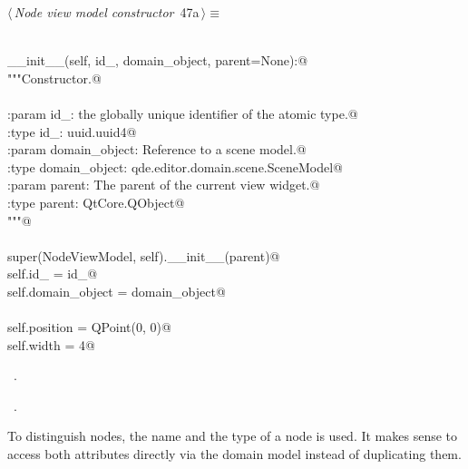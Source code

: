 \documentclass[
    a4paper,      %
    10pt,         %
    openright,    %
    notitlepage,  %
    parskip=half, %
]{scrreprt}       %
\theoremstyle{definition}                    %
\begin{document}
\begin{flushleft} \small
\begin{minipage}{\linewidth}\label{scrap60}\raggedright\small
{} $\langle\,${\itshape Node view model constructor}\nobreak\ {\footnotesize {47a}}$\,\rangle\equiv$
\vspace{-1exm}
\begin{list}{}{} \item
\mbox{}\lstinline@@\\
\mbox{}\lstinline@def __init__(self, id_, domain_object, parent=None):@\\
\mbox{}\lstinline@    """Constructor.@\\
\mbox{}\lstinline@@\\
\mbox{}\lstinline@    :param id_: the globally unique identifier of the atomic type.@\\
\mbox{}\lstinline@    :type  id_: uuid.uuid4@\\
\mbox{}\lstinline@    :param domain_object: Reference to a scene model.@\\
\mbox{}\lstinline@    :type  domain_object: qde.editor.domain.scene.SceneModel@\\
\mbox{}\lstinline@    :param parent: The parent of the current view widget.@\\
\mbox{}\lstinline@    :type parent:  QtCore.QObject@\\
\mbox{}\lstinline@    """@\\
\mbox{}\lstinline@@\\
\mbox{}\lstinline@    super(NodeViewModel, self).__init__(parent)@\\
\mbox{}\lstinline@    self.id_ = id_@\\
\mbox{}\lstinline@    self.domain_object = domain_object@\\
\mbox{}\lstinline@@\\
\mbox{}\lstinline@    self.position = QPoint(0, 0)@\\
\mbox{}\lstinline@    self.width = 4@\\
\mbox{}\lstinline@@{\NWsep}
\end{list}
\vspace{-1.5ex}
\footnotesize
\begin{list}{}{\setlength{\itemsep}{-\parsep}\setlength{\itemindent}{-\leftmargin}}
\item \NWtxtMacroDefBy\ .
\item \NWtxtMacroRefIn\ .

\item{}
\end{list}
\end{minipage}\vspace{4ex}
\end{flushleft}
To distinguish nodes, the name and the type of a node is used. It makes sense to
access both attributes directly via the domain model instead of duplicating them.
\end{document}
